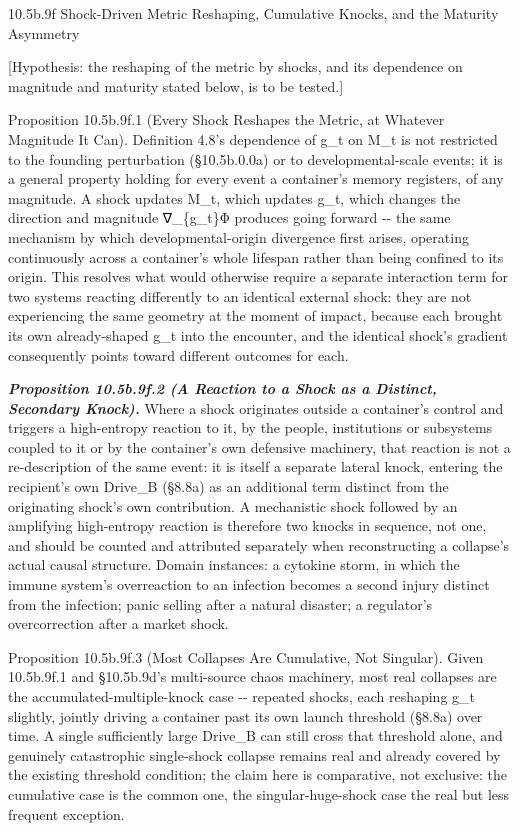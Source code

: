 \documentclass[
]{article}
\begin{document}
10.5b.9f Shock-Driven Metric Reshaping, Cumulative Knocks, and the
Maturity Asymmetry

{[}Hypothesis: the reshaping of the metric by shocks, and its dependence
on magnitude and maturity stated below, is to be tested.{]}

Proposition 10.5b.9f.1 (Every Shock Reshapes the Metric, at Whatever
Magnitude It Can). Definition 4.8's dependence of g\_t on M\_t is not
restricted to the founding perturbation (§10.5b.0.0a) or to
developmental-scale events; it is a general property holding for every
event a container's memory registers, of any magnitude. A shock updates
M\_t, which updates g\_t, which changes the direction and magnitude
∇\_\{g\_t\}Φ produces going forward -\/- the same mechanism by which
developmental-origin divergence first arises, operating continuously
across a container's whole lifespan rather than being confined to its
origin. This resolves what would otherwise require a separate
interaction term for two systems reacting differently to an identical
external shock: they are not experiencing the same geometry at the
moment of impact, because each brought its own already-shaped g\_t into
the encounter, and the identical shock's gradient consequently points
toward different outcomes for each.

\emph{\textbf{Proposition 10.5b.9f.2 (A Reaction to a Shock as a
Distinct, Secondary Knock).}} Where a shock originates outside a
container's control and triggers a high-entropy reaction to it, by the
people, institutions or subsystems coupled to it or by the container's
own defensive machinery, that reaction is not a re-description of the
same event: it is itself a separate lateral knock, entering the
recipient's own Drive\_B (§8.8a) as an additional term distinct from the
originating shock's own contribution. A mechanistic shock followed by an
amplifying high-entropy reaction is therefore two knocks in sequence,
not one, and should be counted and attributed separately when
reconstructing a collapse's actual causal structure. Domain instances: a
cytokine storm, in which the immune system's overreaction to an
infection becomes a second injury distinct from the infection; panic
selling after a natural disaster; a regulator's overcorrection after a
market shock.

Proposition 10.5b.9f.3 (Most Collapses Are Cumulative, Not Singular).
Given 10.5b.9f.1 and §10.5b.9d's multi-source chaos machinery, most real
collapses are the accumulated-multiple-knock case -\/- repeated shocks,
each reshaping g\_t slightly, jointly driving a container past its own
launch threshold (§8.8a) over time. A single sufficiently large Drive\_B
can still cross that threshold alone, and genuinely catastrophic
single-shock collapse remains real and already covered by the existing
threshold condition; the claim here is comparative, not exclusive: the
cumulative case is the common one, the singular-huge-shock case the real
but less frequent exception.
\end{document}
